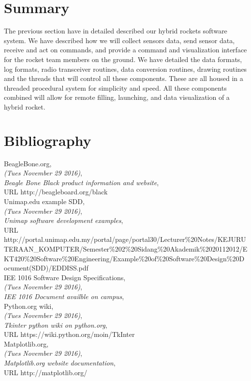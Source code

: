 \documentclass[10pt,draftclsnofoot,onecolumn,compsoc]{IEEEtran}
\begin{document}
\section{Summary}
The previous section have in detailed described our hybrid rockets software system. We have described how we will collect sensors data, send sensor data, receive and act on commands, and provide  a command and visualization interface for the rocket team members on the ground. We have detailed the data formats, log formats, radio transceiver routines, data conversion routines, drawing routines and the threads that will control all these components. These are all housed in a threaded procedural system for simplicity and speed. All these components combined will allow for remote filling, launching, and data visualization of a hybrid rocket. \par

\newpage

\section{Bibliography}
\begin{thebibliography}{9}

 BeagleBone.org,\\
\emph{(Tues November 29 2016)},\\
  \emph{Beagle Bone Black product information and website},\\
URL  http://beagleboard.org/black \\

Unimap.edu example SDD,\\
\emph{(Tues November 29 2016)}, \\
  \emph{Unimap software development examples}, \\
URL http://portal.unimap.edu.my/portal/page/portal30/Lecturer\%20Notes/KEJURUTERAAN\_KOMPUTER/Semester\%202\%20Sidang\%20Akademik\%2020112012/EKT420\%20Software\%20Engineering/Example\%20of\%20Software\%20Design\%20Document(SDD)/EDDISS.pdf \\

IEE 1016 Software Design Specifications,\\
\emph{(Tues November 29 2016)}, \\
  \emph{IEE 1016 Document availble on campus}, \\

Python.org wiki,\\
\emph{(Tues November 29 2016)}, \\
  \emph{Tkinter python wiki on python.org}, \\
URL https://wiki.python.org/moin/TkInter\\

Matplotlib.org,\\
\emph{(Tues November 29 2016)}, \\
  \emph{Matplotlib.org website documentation}, \\
URL http://matplotlib.org/

\end{thebibliography}
\end{document}
